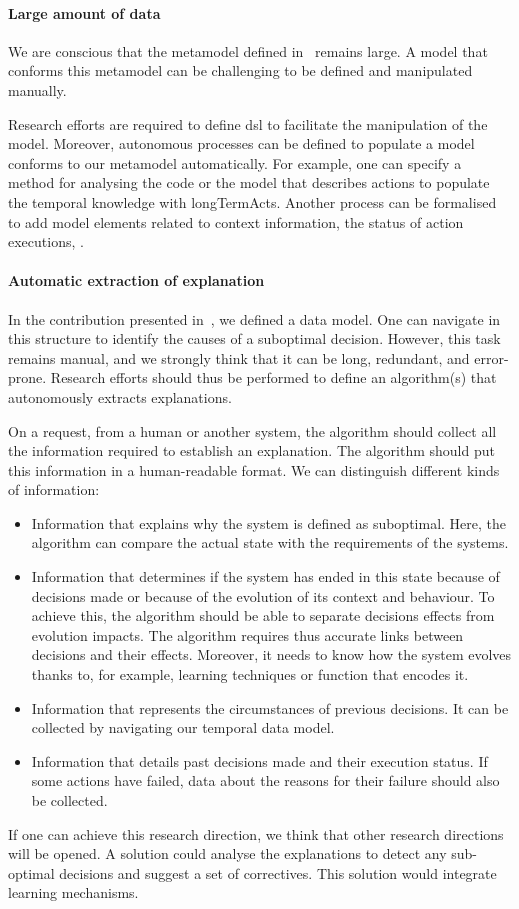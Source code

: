 \paragraph{Large amount of data}
We are conscious that the \gls{metamodel} defined in~ remains large.
A \gls{model} that conforms this \gls{metamodel} can be challenging to be defined and manipulated manually.

Research efforts are required to define \gls{dsl} to facilitate the manipulation of the \gls{model}.
Moreover, autonomous processes can be defined to populate a \gls{model} conforms to our \gls{metamodel} automatically.
For example, one can specify a method for analysing the code or the model that describes \glspl{action} to populate the temporal knowledge with \glspl{longTermAct}.
Another process can be formalised to add \gls{model} elements related to context information, the status of action executions, \etc.

\paragraph{Automatic extraction of explanation}
In the contribution presented in~, we defined a data model.
One can navigate in this structure to identify the causes of a suboptimal decision.
However, this task remains manual, and we strongly think that it can be long, redundant, and error-prone.
Research efforts should thus be performed to define an algorithm(s) that autonomously extracts explanations.

On a request, from a human or another system, the algorithm should collect all the information required to establish an explanation.
The algorithm should put this information in a human-readable format.
We can distinguish different kinds of information:
\begin{itemize}
	\item Information that explains why the system is defined as suboptimal. Here, the algorithm can compare the actual state  with the requirements of the systems.
	\item Information that determines if the system has ended in this state because of decisions made or because of the evolution of its context and behaviour. To achieve this, the algorithm should be able to separate decisions effects from evolution impacts. The algorithm requires thus accurate links between decisions and their effects. Moreover, it needs to know how the system evolves thanks to, for example, learning techniques or function that encodes it.
	\item Information that represents the circumstances of previous decisions. It can be collected by navigating our temporal data model.
	\item Information that details past decisions made and their execution status. If some actions have failed, data about the reasons for their failure should also be collected.
\end{itemize}

If one can achieve this research direction, we think that other research directions will be opened.
A solution could analyse the explanations to detect any sub-optimal decisions and suggest a set of correctives.
This solution would integrate learning mechanisms.





